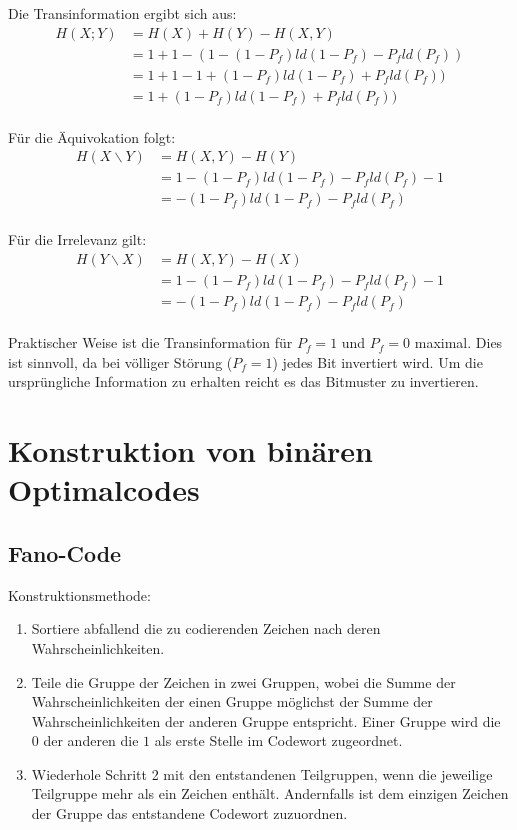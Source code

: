Die Transinformation ergibt sich aus:
\begin{align*}
	H(X;Y) &= H(X) + H(Y) - H(X,Y) \\
	       &= 1 + 1 - (1 - (1 - P_f)
	       ld(1-P_f) - P_fld(P_f))\\
	       &= 1 + 1 - 1 + (1 - P_f)
	       ld(1-P_f) + P_fld(P_f))\\
	       &= 1 + (1 - P_f)
	       ld(1-P_f) + P_fld(P_f))\\
\end{align*}

Für die Äquivokation folgt:
\begin{align*}
	H(X \backslash Y) &= H(X, Y) - H(Y) \\
	&= 1 - (1 - P_f)ld(1-P_f) 
	- P_fld(P_f) - 1\\
	&= -(1 - P_f)ld(1-P_f) - P_fld(P_f) \\
\end{align*}

Für die Irrelevanz gilt:
\begin{align*}
	H(Y \backslash X) &= H(X, Y) - H(X) \\
	&= 1 - (1 - P_f)ld(1-P_f) 
	- P_fld(P_f) - 1\\
	&= -(1 - P_f)ld(1-P_f) - P_fld(P_f) \\
\end{align*}

Praktischer Weise ist die Transinformation für $P_f = 1$ und $P_f = 0$ maximal. Dies ist sinnvoll, da bei völliger Störung ($P_f = 1$) jedes Bit invertiert wird. Um die ursprüngliche Information zu erhalten reicht es das Bitmuster zu invertieren.


\section{Konstruktion von binären Optimalcodes}
\subsection{Fano-Code}
Konstruktionsmethode:
\begin{enumerate}
\item Sortiere abfallend die zu codierenden Zeichen nach deren Wahrscheinlichkeiten.
\item Teile die Gruppe der Zeichen in zwei Gruppen, wobei die Summe der Wahrscheinlichkeiten der einen Gruppe möglichst der Summe der Wahrscheinlichkeiten der anderen Gruppe entspricht. Einer Gruppe wird die $0$ der anderen die $1$ als erste Stelle im Codewort zugeordnet.
\item Wiederhole Schritt 2 mit den entstandenen Teilgruppen, wenn die jeweilige Teilgruppe mehr als ein Zeichen enthält. Andernfalls ist dem einzigen Zeichen der Gruppe das entstandene Codewort zuzuordnen.
\end{enumerate}

